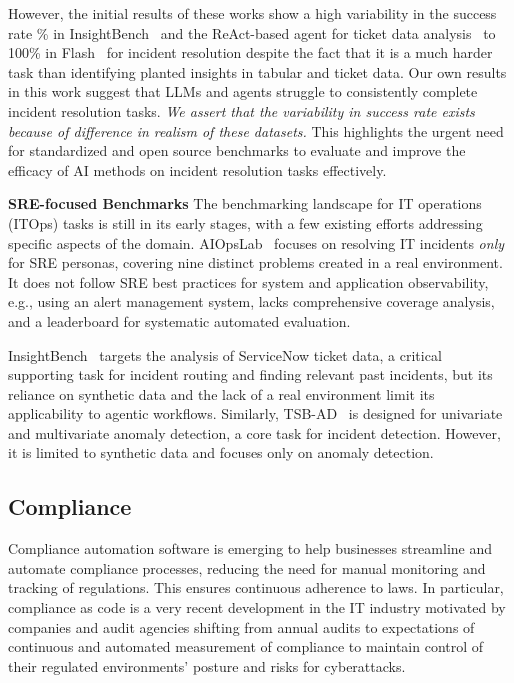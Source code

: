 However, the initial results of these works show a high variability in the success rate \% in InsightBench~\cite{workarena++} and the ReAct-based agent for ticket data analysis~\cite{roy2024exploringllmbasedagentsroot} to 100\% in Flash~\cite{aiopslab} for incident resolution despite the fact that %
it is a much harder task than identifying planted insights in tabular and ticket data. 
Our own results in this work suggest that LLMs and agents struggle to consistently complete incident resolution tasks.
\textit{We assert that the variability in success rate exists because of difference in realism of these datasets.}
This highlights the urgent need for standardized and open source benchmarks to evaluate and improve the efficacy of AI methods on incident resolution tasks effectively.

\textbf{SRE-focused Benchmarks}
The benchmarking landscape for IT operations (ITOps) tasks is still in its early stages, with a few existing efforts addressing specific aspects of the domain. 
AIOpsLab~\cite{aiopslab} focuses on resolving IT incidents  \textit{only} for SRE personas, covering nine distinct problems created in a real environment. 
It does not follow SRE best practices for system and application observability, e.g., using an alert management system, lacks comprehensive coverage analysis, and a leaderboard for systematic automated evaluation. 

InsightBench~\cite{sahu2024insightbench} targets the analysis of ServiceNow ticket data, a critical supporting task for incident routing and finding relevant past incidents, but its reliance on synthetic data and the lack of a real environment limit its applicability to agentic workflows. 
Similarly, TSB-AD~\cite{liu2024elephant} is designed for univariate and multivariate anomaly detection, a core task for incident detection. However, it is limited to synthetic data and focuses only on anomaly detection.


\subsection{Compliance}
Compliance automation software is emerging to help businesses streamline and automate compliance processes, reducing the need for manual monitoring and tracking of regulations. This ensures continuous adherence to laws. In particular, compliance as code is a very recent development in the IT industry motivated by companies and audit agencies shifting from annual audits to expectations of continuous and automated measurement of compliance to maintain control of their regulated environments' posture and risks for cyberattacks. 

